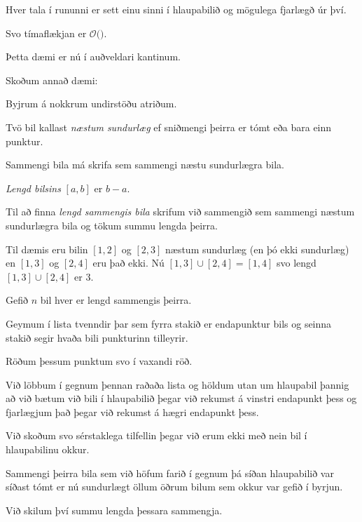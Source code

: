 {
	\only<all:1>{\hbilA}
	\only<all:2>{\hbilB}
	\only<all:3>{\hbilC}
	\only<all:4>{\hbilD}
	\only<all:5>{\hbilE}
	\only<all:6>{\hbilF}
	\only<all:7>{\hbilG}
	\only<all:8>{\hbilH}
	\only<all:9>{\hbilI}
	\only<all:10>{\hbilJ}
	\only<all:11>{\hbilK}
	\only<all:12>{\hbilL}
	\only<all:13>{\hbilM}
	\only<all:14>{\hbilN}
	\only<all:15>{\hbilO}
	\only<all:16>{\hbilP}
	\only<all:17>{\hbilQ}
	\only<all:18>{\hbilR}
	\only<all:19>{\hbilS}
	\only<all:20>{\hbilT}
	\only<all:21>{\hbilU}
	\only<all:22>{\hbilV}
	\only<all:23>{\hbilW}
	\only<all:24>{\hbilX}
	\only<all:25>{\hbilY}
}

{
}

{
	{
		\item<1-> Hver tala í rununni er sett einu sinni í hlaupabilið og mögulega fjarlægð úr því.
		\item<2-> Svo tímaflækjan er $\mathcal{O}($\onslide<3->{$\,n\,$}$)$.
	}
}

{
	{
		\item<1-> Þetta dæmi er nú í auðveldari kantinum.
		\item<2-> Skoðum annað dæmi:
		\item<3-> Byjrum á nokkrum undirstöðu atriðum.
		\item<4-> Tvö bil kallast \emph{næstum sundurlæg} ef sniðmengi þeirra er tómt eða bara einn punktur.
		\item<5-> Sammengi bila má skrifa sem sammengi næstu sundurlægra bila.
		\item<6-> \emph{Lengd bilsins} $[a, b]$ er $b - a$.
		\item<7-> Til að finna \emph{lengd sammengis bila} skrifum við sammengið sem sammengi næstum sundurlægra bila
			og tökum summu lengda þeirra.
		\item<8-> Til dæmis eru bilin $[1, 2]$ og $[2, 3]$ næstum sundurlæg (en þó ekki sundurlæg) en 
			$[1, 3]$ og $[2, 4]$ eru það ekki. Nú $[1, 3] \cup [2, 4] = [1, 4]$ svo lengd 
			$[1, 3] \cup [2, 4]$ er $3$.
	}
}

{
	{
		\item<1-> Gefið $n$ bil hver er lengd sammengis þeirra.
	}
}

{
	{
		\item<1-> Geymum í lista tvenndir þar sem fyrra stakið er endapunktur bils og seinna stakið segir hvaða bili punkturinn tilleyrir.
		\item<2-> Röðum þessum punktum svo í vaxandi röð.
		\item<3-> Við löbbum í gegnum þennan raðaða lista og höldum utan um hlaupabil þannig að
			við bætum við bili í hlaupabilið þegar við rekumst á vinstri endapunkt þess og fjarlægjum það 
			þegar við rekumst á hægri endapunkt þess. 
		\item<4-> Við skoðum svo sérstaklega tilfellin þegar við erum ekki með nein bil í hlaupabilinu okkur.
		\item<5-> Sammengi þeirra bila sem við höfum farið í gegnum þá síðan hlaupabilið var síðast tómt er nú
			sundurlægt öllum öðrum bilum sem okkur var gefið í byrjun.
		\item<6-> Við skilum því summu lengda þessara sammengja.
	}
}

